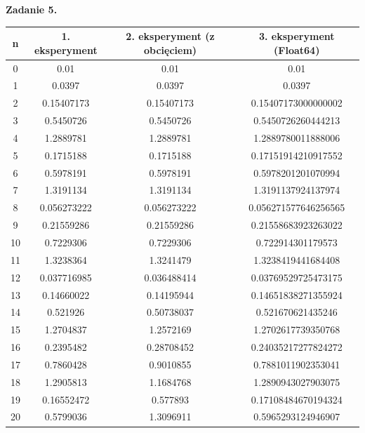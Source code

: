 \documentclass[15pt, a4paper]{article}
\begin{document}
\noindent\hrulefill


\vspace{0.5cm}

\noindent\textbf{Zadanie 5.}  

\begin{longtable}{|c|c|c|c|}
        \hline
        n & 1. eksperyment & 2. eksperyment (z obcięciem) & 3. eksperyment (Float64) \\ \hline
        0 & 0.01 & 0.01 & 0.01 \\ \hline
        1 & 0.0397 & 0.0397 & 0.0397 \\ \hline
        2 & 0.15407173 & 0.15407173 & 0.15407173000000002 \\ \hline
        3 & 0.5450726 & 0.5450726 & 0.5450726260444213 \\ \hline
        4 & 1.2889781 & 1.2889781 & 1.2889780011888006 \\ \hline
        5 & 0.1715188 & 0.1715188 & 0.17151914210917552 \\ \hline
        6 & 0.5978191 & 0.5978191 & 0.5978201201070994 \\ \hline
        7 & 1.3191134 & 1.3191134 & 1.3191137924137974 \\ \hline
        8 & 0.056273222 & 0.056273222 & 0.056271577646256565 \\ \hline
        9 & 0.21559286 & 0.21559286 & 0.21558683923263022 \\ \hline
        10 & 0.7229306 & 0.7229306 & 0.722914301179573 \\ \hline
        11 & 1.3238364 & 1.3241479 & 1.3238419441684408 \\ \hline
        12 & 0.037716985 & 0.036488414 & 0.03769529725473175 \\ \hline
        13 & 0.14660022 & 0.14195944 & 0.14651838271355924 \\ \hline
        14 & 0.521926 & 0.50738037 & 0.521670621435246 \\ \hline
        15 & 1.2704837 & 1.2572169 & 1.2702617739350768 \\ \hline
        16 & 0.2395482 & 0.28708452 & 0.24035217277824272 \\ \hline
        17 & 0.7860428 & 0.9010855 & 0.7881011902353041 \\ \hline
        18 & 1.2905813 & 1.1684768 & 1.2890943027903075 \\ \hline
        19 & 0.16552472 & 0.577893 & 0.17108484670194324 \\ \hline
        20 & 0.5799036 & 1.3096911 & 0.5965293124946907 \\ \hline

\end{longtable}
\end{document}
